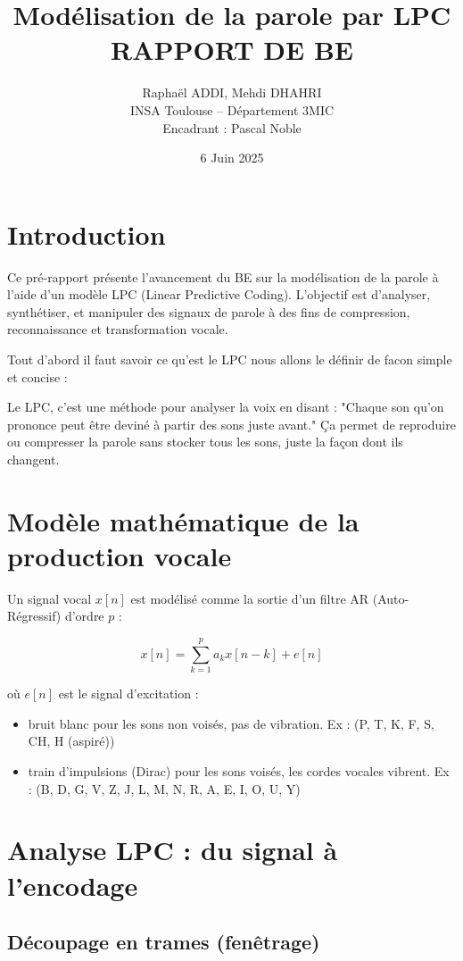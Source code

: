 \documentclass[11pt]{article}
\title{Modélisation de la parole par LPC \\[0.5em]
\large RAPPORT DE BE}
\author{Raphaël ADDI, Mehdi DHAHRI \\
INSA Toulouse – Département 3MIC \\
Encadrant : Pascal Noble}
\date{6 Juin 2025}
\begin{document}
\maketitle
\thispagestyle{empty}
\newpage

\tableofcontents
\newpage

\section{Introduction}

Ce pré-rapport présente l’avancement du BE sur la modélisation de la parole à l’aide d’un modèle LPC (Linear Predictive Coding). L’objectif est d’analyser, synthétiser, et manipuler des signaux de parole à des fins de compression, reconnaissance et transformation vocale.

Tout d'abord il faut savoir ce qu'est le LPC nous allons le définir de facon simple et concise : 

Le LPC, c’est une méthode pour analyser la voix en disant :
"Chaque son qu’on prononce peut être deviné à partir des sons juste avant."
Ça permet de reproduire ou compresser la parole sans stocker tous les sons, juste la façon dont ils changent.

\section{Modèle mathématique de la production vocale}

Un signal vocal \( x[n] \) est modélisé comme la sortie d’un filtre AR (Auto-Régressif) d’ordre \( p \) :

\[
x[n] = \sum_{k=1}^{p} a_k x[n-k] + e[n]
\]

où \( e[n] \) est le signal d’excitation :
\begin{itemize}
    \item bruit blanc pour les sons non voisés, pas de vibration. Ex : (P, T, K, F, S, CH, H (aspiré))
    \item train d’impulsions (Dirac) pour les sons voisés, les cordes vocales vibrent. Ex : (B, D, G, V, Z, J, L, M, N, R, A, E, I, O, U, Y)
\end{itemize}

\section{Analyse LPC : du signal à l'encodage}

\subsection{Découpage en trames (fenêtrage)}
\end{document}
